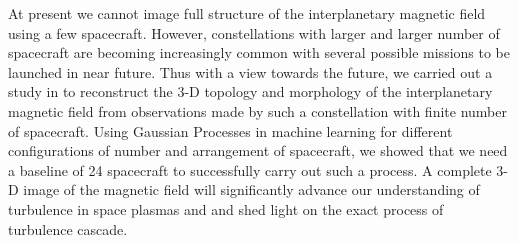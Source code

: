         At present we cannot image full structure of the interplanetary magnetic field using a few
        spacecraft. However, constellations with larger and larger number of spacecraft are becoming
        increasingly common with several possible missions to be launched in near future. Thus with
        a view towards the future, we carried out a study in  to reconstruct the
        3-D topology and morphology of the interplanetary magnetic field from observations made by
        such a constellation with finite number of spacecraft. Using Gaussian Processes in machine
        learning for different configurations of number and arrangement of spacecraft, we showed
        that we need a baseline of 24 spacecraft to successfully carry out such a process. A
        complete 3-D image of the magnetic field will significantly advance our understanding of
        turbulence in space plasmas and and shed light on the exact process of turbulence cascade.